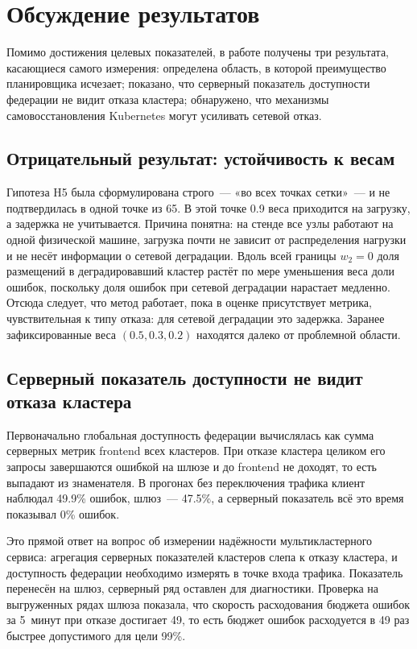 \chapter{Обсуждение результатов}
\label{ch:discussion}

Помимо достижения целевых показателей, в работе получены три результата,
касающиеся самого измерения: определена область, в которой преимущество
планировщика исчезает; показано, что серверный показатель доступности
федерации не видит отказа кластера; обнаружено, что механизмы
самовосстановления Kubernetes могут усиливать сетевой отказ.

\section{Отрицательный результат: устойчивость к весам}

Гипотеза H5 была сформулирована строго~--- «во всех точках сетки»~--- и не
подтвердилась в одной точке из 65. В этой точке 0.9 веса приходится на
загрузку, а задержка не учитывается. Причина понятна: на стенде все узлы
работают на одной физической машине, загрузка почти не зависит от
распределения нагрузки и не несёт информации о сетевой деградации. Вдоль
всей границы $w_2 = 0$ доля размещений в деградировавший кластер растёт по
мере уменьшения веса доли ошибок, поскольку доля ошибок при сетевой
деградации нарастает медленно. Отсюда следует, что метод работает, пока
в оценке присутствует метрика, чувствительная к типу отказа: для сетевой
деградации это задержка. Заранее зафиксированные веса $(0.5, 0.3, 0.2)$
находятся далеко от проблемной области.

\section{Серверный показатель доступности не видит отказа кластера}

Первоначально глобальная доступность федерации вычислялась как сумма
серверных метрик frontend всех кластеров. При отказе кластера целиком его
запросы завершаются ошибкой на шлюзе и до frontend не доходят, то есть
выпадают из знаменателя. В прогонах без переключения трафика клиент
наблюдал 49.9\% ошибок, шлюз~--- 47.5\%, а серверный показатель всё это
время показывал 0\% ошибок.

Это прямой ответ на вопрос об измерении надёжности мультикластерного
сервиса: агрегация серверных показателей кластеров слепа к отказу
кластера, и доступность федерации необходимо измерять в точке входа
трафика. Показатель перенесён на шлюз, серверный ряд оставлен для
диагностики. Проверка на выгруженных рядах шлюза показала, что скорость
расходования бюджета ошибок за 5~минут при отказе достигает 49, то есть
бюджет ошибок расходуется в 49 раз быстрее допустимого для цели 99\%.

